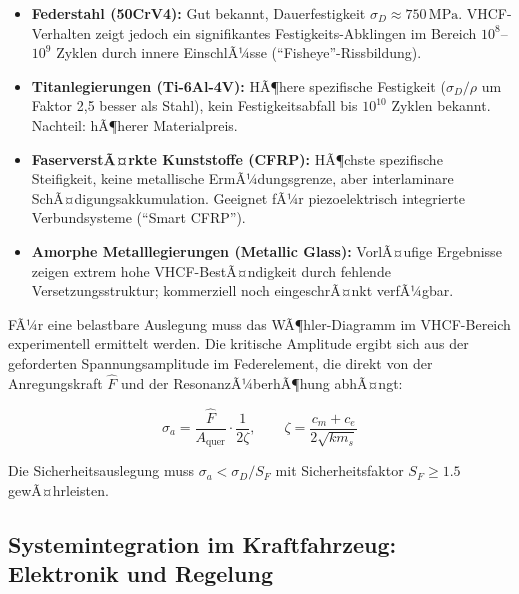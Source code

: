 ﻿\documentclass[12pt, a4paper]{report}
\theoremstyle{definition}
\theoremstyle{remark}
\begin{document}
\begin{itemize}
  \item \textbf{Federstahl (50CrV4):} Gut bekannt, Dauerfestigkeit
        $\sigma_D \approx 750\,\text{MPa}$. VHCF-Verhalten zeigt jedoch
        ein signifikantes Festigkeits-Abklingen im Bereich $10^8$--$10^9$ Zyklen
        durch innere EinschlÃ¼sse (``Fisheye''-Rissbildung).

  \item \textbf{Titanlegierungen (Ti-6Al-4V):} HÃ¶here spezifische Festigkeit
        ($\sigma_D/\rho$ um Faktor 2,5 besser als Stahl), kein Festigkeitsabfall
        bis $10^{10}$ Zyklen bekannt. Nachteil: hÃ¶herer Materialpreis.

  \item \textbf{FaserverstÃ¤rkte Kunststoffe (CFRP):} HÃ¶chste spezifische
        Steifigkeit, keine metallische ErmÃ¼dungsgrenze, aber interlaminare
        SchÃ¤digungsakkumulation. Geeignet fÃ¼r piezoelektrisch integrierte
        Verbundsysteme (``Smart CFRP'').

  \item \textbf{Amorphe Metalllegierungen (Metallic Glass):} VorlÃ¤ufige
        Ergebnisse zeigen extrem hohe VHCF-BestÃ¤ndigkeit durch fehlende
        Versetzungsstruktur; kommerziell noch eingeschrÃ¤nkt verfÃ¼gbar.
\end{itemize}

FÃ¼r eine belastbare Auslegung muss das WÃ¶hler-Diagramm im VHCF-Bereich
experimentell ermittelt werden. Die kritische Amplitude ergibt sich aus
der geforderten Spannungsamplitude im Federelement, die direkt von der
Anregungskraft $\hat{F}$ und der ResonanzÃ¼berhÃ¶hung abhÃ¤ngt:

\begin{equation}
  \sigma_a = \frac{\hat{F}}{A_{\text{quer}}} \cdot \frac{1}{2\zeta},
  \qquad \zeta = \frac{c_m + c_e}{2\sqrt{km_s}}
  \label{eq:sigma_a}
\end{equation}

Die Sicherheitsauslegung muss $\sigma_a < \sigma_D / S_F$ mit
Sicherheitsfaktor $S_F \geq 1.5$ gewÃ¤hrleisten.

\subsection{Systemintegration im Kraftfahrzeug: Elektronik und Regelung}
\label{ssec:ausblick_elektronik}
\end{document}
